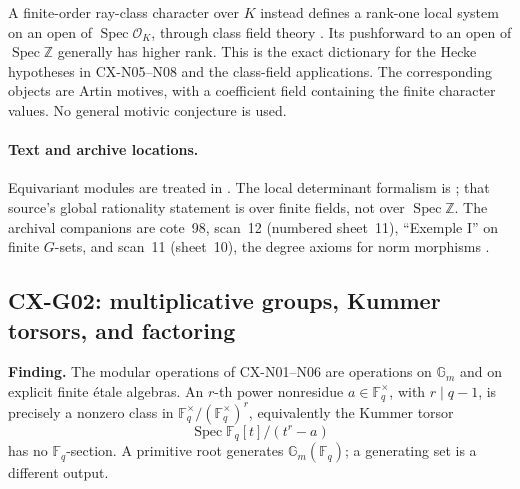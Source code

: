 A finite-order ray-class character over $K$ instead defines a rank-one
local system on an open of $\operatorname{Spec}\mathcal O_K$, through
class field theory \cite[Introduction, Theorems~0.4--0.5]{MilneCFT}.
Its pushforward to an open of $\operatorname{Spec}\mathbb Z$ generally has
higher rank.  This is the exact dictionary for the Hecke hypotheses in
CX-N05--N08 and the class-field applications.  The corresponding objects
are Artin motives, with a coefficient field containing the finite character
values.  No general motivic conjecture is used.

\paragraph{Text and archive locations.}
Equivariant modules are treated in \cite[Exp.~I 4.7.1--4.7.2]{SGA3}.
The local determinant formalism is
\cite[Exp.~XV, \S3 no.~1, Proposition~1, and no.~2]{SGA5}; that source's
global rationality statement is over finite fields, not over
$\operatorname{Spec}\mathbb Z$.
The archival companions are cote~98, scan~12 (numbered sheet~11),
``Exemple I'' on finite $G$-sets, and scan~11 (sheet~10), the degree axioms
for norm morphisms \cite{Archive98}.

\subsection{CX-G02: multiplicative groups, Kummer torsors, and factoring}
\label{finding:CX-G02}

\textbf{Finding.} The modular operations of CX-N01--N06 are operations
on $\mathbb G_m$ and on explicit finite étale algebras.
An $r$-th power nonresidue $a\in\mathbb F_q^\times$, with $r\mid q-1$,
is precisely a nonzero class in
$\mathbb F_q^\times/(\mathbb F_q^\times)^r$, equivalently the Kummer
torsor
\[
 \operatorname{Spec}\mathbb F_q[t]/(t^r-a)
\]
has no $\mathbb F_q$-section.  A primitive root generates
$\mathbb G_m(\mathbb F_q)$; a generating set is a different output.

